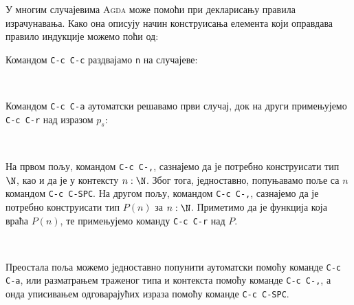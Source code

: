 У многим случајевима \textsc{Agda} може помоћи при декларисању правила израчунавања. Како она описују начин конструисања елемента који оправдава правило индукције можемо поћи од:
\begin{code}%
\>[0]\AgdaSpace{}%
\AgdaSpace{}%
\AgdaSpace{}%
\AgdaSpace{}%
\AgdaSpace{}%
\AgdaSymbol{=}\AgdaSpace{}%
\AgdaHole{\{!\ \ \ !\}}\<%
\end{code}
Командом \texttt{C-c C-c} раздвајамо \texttt{n} на случајеве:
\begin{code}%
\>[0]\AgdaSpace{}%
\AgdaSpace{}%
\AgdaSpace{}%
\AgdaSpace{}%
%
\>[29]\AgdaSymbol{=}\AgdaSpace{}%
\AgdaHole{\{!\ \ \ !\}}\<%
\\
\>[0]\AgdaSpace{}%
\AgdaSpace{}%
\AgdaSpace{}%
\AgdaSpace{}%
\AgdaSymbol{(}\AgdaSpace{}%
\AgdaSymbol{)}\AgdaSpace{}%
\AgdaSymbol{=}\AgdaSpace{}%
\AgdaHole{\{!\ \ \ !\}}\<%
\end{code}
Командом \texttt{C-c C-а} аутоматски решавамо први случај, док на други примењујемо \texttt{C-c C-r} над изразом $p_s$:
\begin{code}%
\>[0]\AgdaSpace{}%
\AgdaSpace{}%
\AgdaSpace{}%
\AgdaSpace{}%
%
\>[29]\AgdaSymbol{=}\AgdaSpace{}%
\<%
\\
\>[0]\AgdaSpace{}%
\AgdaSpace{}%
\AgdaSpace{}%
\AgdaSpace{}%
\AgdaSymbol{(}\AgdaSpace{}%
\AgdaSymbol{)}\AgdaSpace{}%
\AgdaSymbol{=}\AgdaSpace{}%
\AgdaSpace{}%
\AgdaHole{\{!\ \ \ !\}}\AgdaSpace{}%
\AgdaHole{\{!\ \ \ !\}}\<%
\end{code}
На првом пољу, командом \texttt{C-c C-,}, сазнајемо да је потребно конструисати тип $\N$, као и да је у контексту $n : \N$. Због тога, једноставно, попуњавамо поље са $n$ командом \texttt{C-c C-SPC}. На другом пољу, командом \texttt{C-c C-,}, сазнајемо да је потребно конструисати тип $P(n)$ за $n : \N$. Приметимо да је  функција која враћа $P(n)$, те примењујемо команду \texttt{C-c C-r} над  $P$.
\begin{code}%
\>[0]\AgdaSpace{}%
\AgdaSpace{}%
\AgdaSpace{}%
\AgdaSpace{}%
%
\>[29]\AgdaSymbol{=}\AgdaSpace{}%
\<%
\\
\>[0]\AgdaSpace{}%
\AgdaSpace{}%
\AgdaSpace{}%
\AgdaSpace{}%
\AgdaSymbol{(}\AgdaSpace{}%
\AgdaSymbol{)}\AgdaSpace{}%
\AgdaSymbol{=}\AgdaSpace{}%
\AgdaSpace{}%
\AgdaSpace{}%
\AgdaSymbol{(}\AgdaSpace{}%
\AgdaSpace{}%
\AgdaHole{\{!\ \ \ !\}}\AgdaSpace{}%
\AgdaHole{\{!\ \ \ !\}}\AgdaSpace{}%
\AgdaHole{\{!\ \ \ !\}}\AgdaSymbol{)}\<%
\end{code}
Преостала поља можемо једноставно попунити аутоматски помоћу команде \texttt{C-c C-a}, или разматрањем траженог типа и контекста помоћу команде \texttt{C-c C-,}, а онда уписивањем одговарајућих израза помоћу команде \texttt{C-c C-SPC}.
